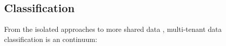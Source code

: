 \documentclass[11pt,english]{article} %
\begin{document}


\subsection{Classification}


From the isolated approaches to more shared data \cite{multi-tenant-data-architecture}, multi-tenant data classification is an continuum:
\end{document}
